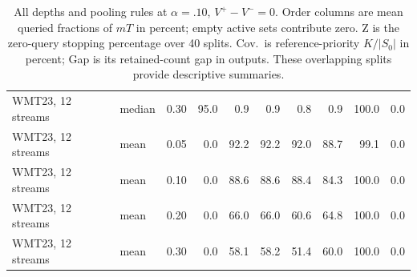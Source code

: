\begin{table}[t]
\begin{tabular}{llrrrrrrrr}
WMT23, 12 streams & median & 0.30 & 95.0 & 0.9 & 0.9 & 0.8 & 0.9 & 100.0 & 0.0 \\
WMT23, 12 streams & mean & 0.05 & 0.0 & 92.2 & 92.2 & 92.0 & 88.7 & 99.1 & 0.0 \\
WMT23, 12 streams & mean & 0.10 & 0.0 & 88.6 & 88.6 & 88.4 & 84.3 & 100.0 & 0.0 \\
WMT23, 12 streams & mean & 0.20 & 0.0 & 66.0 & 66.0 & 60.6 & 64.8 & 100.0 & 0.0 \\
WMT23, 12 streams & mean & 0.30 & 0.0 & 58.1 & 58.2 & 51.4 & 60.0 & 100.0 & 0.0 \\
\bottomrule
\end{tabular}
\caption{All depths and pooling rules at $\alpha=.10$, $V^+-V^-=0$. Order columns are mean queried fractions of $mT$ in percent; empty active sets contribute zero. Z is the zero-query stopping percentage over 40 splits. Cov.\ is reference-priority $K/|S_0|$ in percent; Gap is its retained-count gap in outputs. These overlapping splits provide descriptive summaries.}
\label{tab:all-exact}
\end{table}
